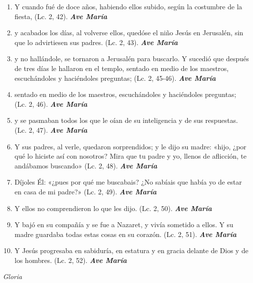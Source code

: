 \documentclass[a4paper,11pt, oneside]{report}
\begin{document}
\begin{enumerate}

  \item Y cuando fué de doce años, habiendo ellos subido, según la costumbre de la fiesta, (Lc. 2, 42). \textbf{\textit{Ave María}}

  \item y acabados los días, al volverse ellos, quedóse el niño Jesús en Jerusalén, sin que lo advirtiesen sus padres. (Lc. 2, 43). \textbf{\textit{Ave María}}

  \item y no hallándole, se tornaron a Jerusalén para buscarlo. Y sucedió que después de tres días le hallaron en el templo,
  sentado en medio de los maestros, escuchándoles y haciéndoles preguntas; (Lc. 2, 45-46). \textbf{\textit{Ave María}}

  \item sentado en medio de los maestros, escuchándoles y haciéndoles preguntas; (Lc. 2, 46). \textbf{\textit{Ave María}}

  \item y se pasmaban todos los que le oían de su inteligencia y de sus respuestas. (Lc. 2, 47). \textbf{\textit{Ave María}}

  \item Y sus padres, al verle, quedaron sorprendidos; y le dijo su madre: «hijo, ¿por qué lo hiciste así con nosotros? Mira que tu padre
  y yo, llenos de aflicción, te andábamos buscando» (Lc. 2, 48). \textbf{\textit{Ave María}}

  \item Díjoles Él: «¿pues por qué me buscabais? ¿No sabíais que había yo de estar en casa de mi padre?» (Lc. 2, 49). \textbf{\textit{Ave María}}

  \item Y ellos no comprendieron lo que les dijo. (Lc. 2, 50). \textbf{\textit{Ave María}}

  \item Y bajó en su compañía y se fue a Nazaret, y vivía sometido a ellos. Y su madre guardaba todas estas
  cosas en su corazón. (Lc. 2, 51). \textbf{\textit{Ave María}}

  \item Y Jesús progresaba en sabiduría, en estatura y en gracia delante de Dios y de los hombres. (Lc. 2, 52). \textbf{\textit{Ave María}}

\end{enumerate}
\indent\textit{Gloria}
\end{document}

